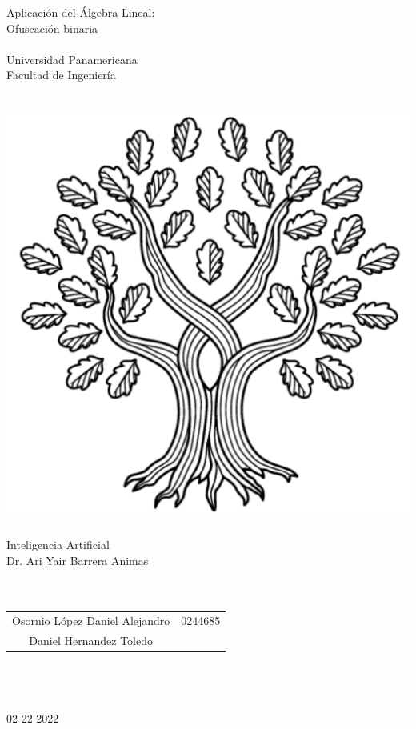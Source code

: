 
\hspace{0pt}
\vfill


\begin{center}
    {\huge Aplicación del Álgebra Lineal:\\Ofuscación binaria}\\    \quad\\
    {\large Universidad Panamericana}\\
    {\large Facultad de Ingeniería}\\
    \quad\\
    \quad\\
    \includegraphics[scale=0.3]{../img/UP}
    \quad\\
    \quad\\
    Inteligencia Artificial\\
    Dr. Ari Yair Barrera Animas\\
    \quad\\
    \quad\\
    \begin{tabular}{c|c}
        Osornio López Daniel Alejandro & 0244685\\
		Daniel Hernandez Toledo & 
    \end{tabular}\\
    \quad\\
    \quad\\
	02 22 2022
\end{center}

